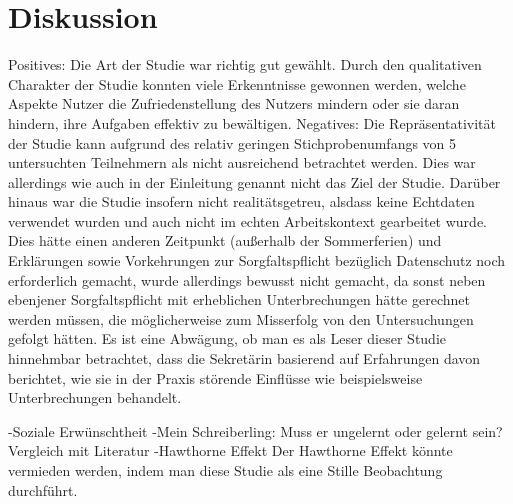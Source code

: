 \section{Diskussion}



Positives: Die Art der Studie war richtig gut gewählt. Durch den qualitativen Charakter der Studie konnten viele Erkenntnisse gewonnen werden, welche Aspekte Nutzer die Zufriedenstellung des Nutzers mindern oder sie daran hindern, ihre Aufgaben effektiv zu bewältigen. 
Negatives: Die Repräsentativität der Studie kann aufgrund des relativ geringen Stichprobenumfangs von 5 untersuchten Teilnehmern als nicht ausreichend betrachtet werden. Dies war allerdings wie auch in der Einleitung genannt nicht das Ziel der Studie. 
Darüber hinaus war die Studie insofern nicht realitätsgetreu, alsdass keine Echtdaten verwendet wurden und auch nicht im echten Arbeitskontext gearbeitet wurde. Dies hätte einen anderen Zeitpunkt (außerhalb der Sommerferien) und Erklärungen sowie Vorkehrungen zur Sorgfaltspflicht bezüglich Datenschutz noch erforderlich gemacht, wurde allerdings bewusst nicht gemacht, da sonst neben ebenjener Sorgfaltspflicht mit erheblichen Unterbrechungen hätte gerechnet werden müssen, die möglicherweise zum Misserfolg von den Untersuchungen gefolgt hätten. Es ist eine Abwägung, ob man es als Leser dieser Studie hinnehmbar betrachtet, dass die Sekretärin basierend auf Erfahrungen davon berichtet, wie sie in der Praxis störende Einflüsse wie beispielsweise Unterbrechungen behandelt.


-Soziale Erwünschtheit
-Mein Schreiberling: Muss er ungelernt oder gelernt sein? Vergleich mit Literatur
-Hawthorne Effekt
Der Hawthorne Effekt könnte vermieden werden, indem man diese Studie als eine Stille Beobachtung durchführt. 
%

